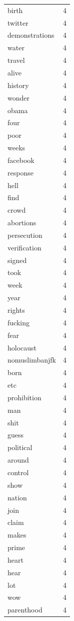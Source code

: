 \begin{tabular}{lr}
birth & 4 \\
twitter & 4 \\
demonstrations & 4 \\
water & 4 \\
travel & 4 \\
alive & 4 \\
history & 4 \\
wonder & 4 \\
obama & 4 \\
four & 4 \\
poor & 4 \\
weeks & 4 \\
facebook & 4 \\
response & 4 \\
hell & 4 \\
find & 4 \\
crowd & 4 \\
abortions & 4 \\
persecution & 4 \\
verification & 4 \\
signed & 4 \\
took & 4 \\
week & 4 \\
year & 4 \\
rights & 4 \\
fucking & 4 \\
fear & 4 \\
holocaust & 4 \\
nomuslimbanjfk & 4 \\
born & 4 \\
etc & 4 \\
prohibition & 4 \\
man & 4 \\
shit & 4 \\
guess & 4 \\
political & 4 \\
around & 4 \\
control & 4 \\
show & 4 \\
nation & 4 \\
join & 4 \\
claim & 4 \\
makes & 4 \\
prime & 4 \\
heart & 4 \\
hear & 4 \\
lot & 4 \\
wow & 4 \\
parenthood & 4 \\

\end{tabular}

